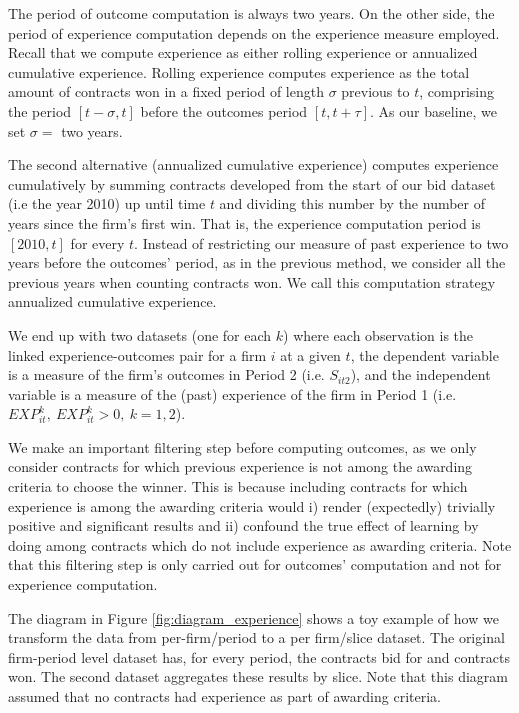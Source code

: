 The period of outcome computation is always two years. On the other side, the period of experience computation depends on the experience measure employed. Recall that we compute experience as either rolling experience or annualized cumulative experience. Rolling experience computes experience as the total amount of contracts won in a fixed period of length $\sigma$ previous to $t$, comprising the period $[t-\sigma,t]$ before the outcomes period $[t,t+\tau]$. As our baseline, we set $\sigma=$ two years.

The second alternative (annualized cumulative experience) computes experience cumulatively by summing contracts developed from the start of our bid dataset (i.e the year 2010) up until time $t$ and dividing this number by the number of years since the firm's first win. That is, the experience computation period is $[2010, t]$ for every $t$. Instead of restricting our measure of past experience to two years before the outcomes' period, as in the previous method, we consider all the previous years when counting contracts won. We call this computation strategy annualized cumulative experience.

We end up with two datasets (one for each $k$) where each observation is the linked experience-outcomes pair for a firm $i$ at a given $t$, the dependent variable is a measure of the firm’s outcomes in Period 2 (i.e. $S_{it2}$), and the independent variable is a measure of the (past) experience of the firm in Period 1 (i.e. $EXP^k_{it},\  EXP^k_{it}>0,\ k=1,2$).

We make an important filtering step before computing outcomes, as we only consider contracts for which previous experience is not among the awarding criteria to choose the winner. This is because including contracts for which experience is among the awarding criteria would i) render (expectedly) trivially positive and significant results and ii) confound the true effect of learning by doing among contracts which do not include experience as awarding criteria. Note that this filtering step is only carried out for outcomes' computation and not for experience computation.

The diagram in Figure \ref{fig:diagram_experience} shows a toy example of how we transform the data from per-firm/period to a per firm/slice dataset. The original firm-period level dataset has, for every period, the contracts bid for and contracts won. The second dataset aggregates these results by slice. Note that this diagram assumed that no contracts had experience as part of awarding criteria.

